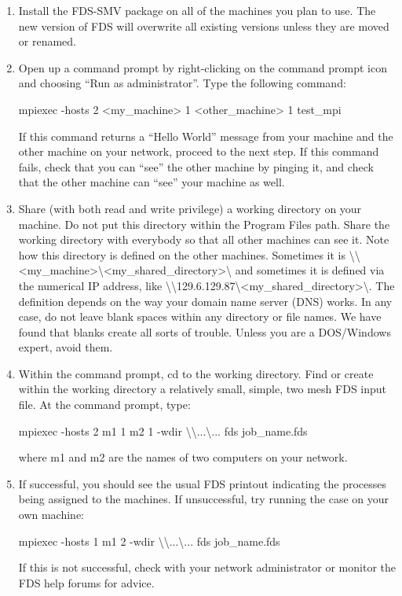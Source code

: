\documentclass[11pt]{book}
\begin{document}
\begin{enumerate}
\item Install the FDS-SMV package on all of the machines you plan to use. The new version of FDS will overwrite all existing versions unless they are moved or renamed.

\item Open up a command prompt by right-clicking on the command prompt icon and choosing ``Run as administrator''. Type the following command:

    {\ct mpiexec -hosts 2 <my\_machine> 1 <other\_machine> 1 test\_mpi}

    If this command returns a ``Hello World'' message from your machine and the other machine on your network, proceed to the next step. If this command fails, check that you can ``see'' the other machine by pinging it, and check that the other machine can ``see'' your machine as well.

\item Share (with both read and write privilege) a working directory on your machine. Do not put this directory within the Program Files path. Share the working directory with everybody so that all other machines can see it. Note how this directory is defined on the other machines. Sometimes it is {\ct \textbackslash\textbackslash<my\_machine>\textbackslash<my\_shared\_directory>\textbackslash} and sometimes it is defined via the numerical IP address, like {\ct \textbackslash\textbackslash129.6.129.87\textbackslash<my\_shared\_directory>\textbackslash}. The definition depends on the way your domain name server (DNS) works. In any case, do not leave blank spaces within any directory or file names. We have found that blanks create all sorts of trouble. Unless you are a DOS/Windows expert, avoid them.

\item Within the command prompt, {\ct cd} to the working directory. Find or create within the working directory a relatively small, simple, two mesh FDS input file. At the command prompt, type:

   {\ct mpiexec -hosts 2 m1 1 m2 1 -wdir \textbackslash\textbackslash...\textbackslash... fds job\_name.fds}

   where {\ct m1} and {\ct m2} are the names of two computers on your network.

\item If successful, you should see the usual FDS printout indicating the processes being assigned to the machines. If unsuccessful, try running the case on your own machine:

   {\ct mpiexec -hosts 1 m1 2 -wdir \textbackslash\textbackslash...\textbackslash... fds job\_name.fds}

   If this is not successful, check with your network administrator or monitor the FDS help forums for advice.
\end{enumerate}
\end{document}
